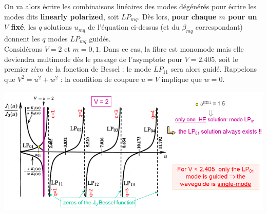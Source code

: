On va alors écrire les combinaisons linéaires des modes dégénérés pour écrire les modes dits \textbf{
linearly polarized}, soit $LP_{mq}$. Dès lors, \textbf{pour chaque $m$ pour un $V$ fixé}, les $q$ 
solutions $u_{mq}$ de l'équation ci-dessus (et du $\beta_{mq}$ correspondant) donnent les $q$ 
modes $LP_{mq}$ guidés.\\

Considérons $V=2$ et $m=0,1$. Dans ce cas, la fibre est monomode mais elle deviendra multimode dès
le passage de l'asymptote pour $V=2.405$, soit le premier zéro de la fonction de Bessel : le mode
$LP_{11}$ sera alors guidé. Rappelons que $V^2=u^2+w^2$ : la condition de coupure $u=V$ implique que
$w=0$.

\begin{center}
	\includegraphics[scale=0.64]{ch1/image22}
\end{center}

